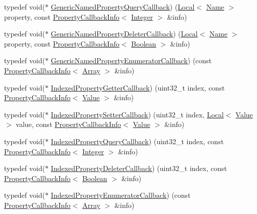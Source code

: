 \begin{DoxyCompactItemize}
\item 
typedef void($\ast$ \hyperlink{namespacev8_add9f7ab11e4a9a2b9ad2c4536b0e1a64}{Generic\+Named\+Property\+Query\+Callback}) (\hyperlink{classv8_1_1Local}{Local}$<$ \hyperlink{classv8_1_1Name}{Name} $>$ property, const \hyperlink{classv8_1_1PropertyCallbackInfo}{Property\+Callback\+Info}$<$ \hyperlink{classv8_1_1Integer}{Integer} $>$ \&info)
\item 
typedef void($\ast$ \hyperlink{namespacev8_ad2aecc0406ea4bc02d5a4f84a433b273}{Generic\+Named\+Property\+Deleter\+Callback}) (\hyperlink{classv8_1_1Local}{Local}$<$ \hyperlink{classv8_1_1Name}{Name} $>$ property, const \hyperlink{classv8_1_1PropertyCallbackInfo}{Property\+Callback\+Info}$<$ \hyperlink{classv8_1_1Boolean}{Boolean} $>$ \&info)
\item 
typedef void($\ast$ \hyperlink{namespacev8_a20826eb7e52e84fa4f632534e8eddd04}{Generic\+Named\+Property\+Enumerator\+Callback}) (const \hyperlink{classv8_1_1PropertyCallbackInfo}{Property\+Callback\+Info}$<$ \hyperlink{classv8_1_1Array}{Array} $>$ \&info)
\item 
typedef void($\ast$ \hyperlink{namespacev8_a48e7816ba64447bf32a25d194588daaf}{Indexed\+Property\+Getter\+Callback}) (uint32\+\_\+t index, const \hyperlink{classv8_1_1PropertyCallbackInfo}{Property\+Callback\+Info}$<$ \hyperlink{classv8_1_1Value}{Value} $>$ \&info)
\item 
typedef void($\ast$ \hyperlink{namespacev8_a4ac7cc6185ebc8b6a199f9fa8e6bf5c3}{Indexed\+Property\+Setter\+Callback}) (uint32\+\_\+t index, \hyperlink{classv8_1_1Local}{Local}$<$ \hyperlink{classv8_1_1Value}{Value} $>$ value, const \hyperlink{classv8_1_1PropertyCallbackInfo}{Property\+Callback\+Info}$<$ \hyperlink{classv8_1_1Value}{Value} $>$ \&info)
\item 
typedef void($\ast$ \hyperlink{namespacev8_a980b62c33eb664783e61e25c3b27f9ee}{Indexed\+Property\+Query\+Callback}) (uint32\+\_\+t index, const \hyperlink{classv8_1_1PropertyCallbackInfo}{Property\+Callback\+Info}$<$ \hyperlink{classv8_1_1Integer}{Integer} $>$ \&info)
\item 
typedef void($\ast$ \hyperlink{namespacev8_a53863728de14cde48dd6543207b2f2da}{Indexed\+Property\+Deleter\+Callback}) (uint32\+\_\+t index, const \hyperlink{classv8_1_1PropertyCallbackInfo}{Property\+Callback\+Info}$<$ \hyperlink{classv8_1_1Boolean}{Boolean} $>$ \&info)
\item 
typedef void($\ast$ \hyperlink{namespacev8_adbb0a6d5537371953f9ba807d4f6275e}{Indexed\+Property\+Enumerator\+Callback}) (const \hyperlink{classv8_1_1PropertyCallbackInfo}{Property\+Callback\+Info}$<$ \hyperlink{classv8_1_1Array}{Array} $>$ \&info)

\end{DoxyCompactItemize}
